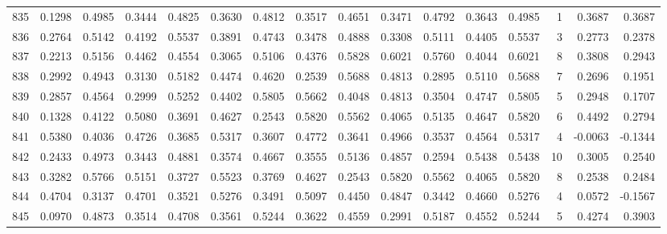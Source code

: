 \begin{tabular}{lrrrrrrrrrrrrrrr}
835 &      0.1298 &  0.4985 &  0.3444 &  0.4825 &  0.3630 &  0.4812 &  0.3517 &  0.4651 &  0.3471 &  0.4792 &   0.3643 &     0.4985 &      1 &                    0.3687 &                     0.3687 \\
836 &      0.2764 &  0.5142 &  0.4192 &  0.5537 &  0.3891 &  0.4743 &  0.3478 &  0.4888 &  0.3308 &  0.5111 &   0.4405 &     0.5537 &      3 &                    0.2773 &                     0.2378 \\
837 &      0.2213 &  0.5156 &  0.4462 &  0.4554 &  0.3065 &  0.5106 &  0.4376 &  0.5828 &  0.6021 &  0.5760 &   0.4044 &     0.6021 &      8 &                    0.3808 &                     0.2943 \\
838 &      0.2992 &  0.4943 &  0.3130 &  0.5182 &  0.4474 &  0.4620 &  0.2539 &  0.5688 &  0.4813 &  0.2895 &   0.5110 &     0.5688 &      7 &                    0.2696 &                     0.1951 \\
839 &      0.2857 &  0.4564 &  0.2999 &  0.5252 &  0.4402 &  0.5805 &  0.5662 &  0.4048 &  0.4813 &  0.3504 &   0.4747 &     0.5805 &      5 &                    0.2948 &                     0.1707 \\
840 &      0.1328 &  0.4122 &  0.5080 &  0.3691 &  0.4627 &  0.2543 &  0.5820 &  0.5562 &  0.4065 &  0.5135 &   0.4647 &     0.5820 &      6 &                    0.4492 &                     0.2794 \\
841 &      0.5380 &  0.4036 &  0.4726 &  0.3685 &  0.5317 &  0.3607 &  0.4772 &  0.3641 &  0.4966 &  0.3537 &   0.4564 &     0.5317 &      4 &                   -0.0063 &                    -0.1344 \\
842 &      0.2433 &  0.4973 &  0.3443 &  0.4881 &  0.3574 &  0.4667 &  0.3555 &  0.5136 &  0.4857 &  0.2594 &   0.5438 &     0.5438 &     10 &                    0.3005 &                     0.2540 \\
843 &      0.3282 &  0.5766 &  0.5151 &  0.3727 &  0.5523 &  0.3769 &  0.4627 &  0.2543 &  0.5820 &  0.5562 &   0.4065 &     0.5820 &      8 &                    0.2538 &                     0.2484 \\
844 &      0.4704 &  0.3137 &  0.4701 &  0.3521 &  0.5276 &  0.3491 &  0.5097 &  0.4450 &  0.4847 &  0.3442 &   0.4660 &     0.5276 &      4 &                    0.0572 &                    -0.1567 \\
845 &      0.0970 &  0.4873 &  0.3514 &  0.4708 &  0.3561 &  0.5244 &  0.3622 &  0.4559 &  0.2991 &  0.5187 &   0.4552 &     0.5244 &      5 &                    0.4274 &                     0.3903 \\

\end{tabular}
